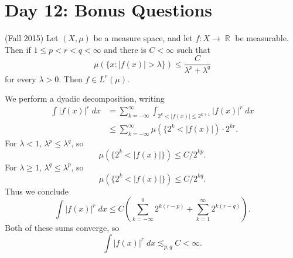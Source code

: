 \documentclass[answers]{exam}
\DeclareMathOperator{\RR}{\mathbb{R}}
\theoremstyle{problemstyle}
\newcommand{\1}[1]{\textbf{1}_{\left[#1\right]}} %
\begin{document}
\begin{questions}
\begin{parts}
\begin{solution}
\begin{comment}
    
    Any element of $H^1(\RR_+)$ is continuous, and has a well defined value at zero (a trace). Given $f \in H^1(\RR_+)$, define
    \[ T^*f(x) = \begin{cases} f(0) e^x &: x < 0 \\ f(x) &: x > 0. \end{cases} \]
    Then $T^* f$ is obviously square integrable, and
    \begin{align*}
        \int T^*f(x) \phi(x)\; dx &= f(0) \int_{-\infty}^0 e^x \phi'(x)\; dx + \int_0^\infty f(x) \phi'(x)\; dx\\
        &= f(0) \left[ \phi'(0) - \int_{-\infty}^0 e^x \phi(x)\; dx \right] + \int_0^\infty f(x) \phi'(x)\; dx\\
        &= - f(0) \int_{-\infty}^0 e^x \phi(x)\; dx + \int_0^\infty f(x) \phi'(x)\; dx
    \end{align*}
    
    
    One can argue (Morrey's inequality for example, plus the density of $C_c^\infty(\RR)$ in $H^1(\RR)$), that if $g \in K$, then $g(0) = 0$.
\end{comment}
\end{solution}

\end{parts}







\newpage
\section{Day 12: Bonus Questions}

\question (Fall 2015) Let $(X, \mu)$ be a measure space, and let $f: X \to \RR$ be measurable. Then if $1 \leq p < r < q < \infty$ and there is $C < \infty$ such that
%
\[ \mu(\{ x : |f(x)| > \lambda \}) \leq \frac{C}{\lambda^p + \lambda^q} \]
%
for every $\lambda > 0$. Then $f \in L^r(\mu)$.
\begin{solution}
    We perform a dyadic decomposition, writing
    \begin{align*}
        \int |f(x)|^r\; dx &= \sum_{k = -\infty}^\infty \int_{2^k < |f(x)| \leq 2^{k+1}} |f(x)|^r\; dx\\
        &\leq \sum_{k = -\infty}^\infty \mu(\{ 2^k < |f(x)|) \cdot 2^{kr}.
    \end{align*}
    For $\lambda < 1$, $\lambda^p \leq \lambda^q$, so
    \[ \mu(\{ 2^k < |f(x)| \}) \leq C/2^{kp}. \]
    For $\lambda \geq 1$, $\lambda^q \leq \lambda^p$, so
    \[ \mu(\{ 2^k < |f(x)| \}) \leq C/2^{kq}. \]
    Thus we conclude
    \[ \int |f(x)|^r\; dx \leq C \left( \sum_{k = -\infty}^0 2^{k(r - p)} + \sum_{k = 1}^\infty 2^{k(r - q)} \right). \]
    Both of these sums converge, so
    \[  \int |f(x)|^r\; dx \lesssim_{p,q} C < \infty. \]
\end{solution}


\end{questions}
\end{document}
